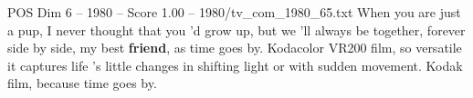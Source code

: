 \begin{textsample}{POS Dim 6 – 1980 – Score 1.00 – 1980/tv\_com\_1980\_65.txt}  \label{ex:f6_pos_054}
When you are just a pup, I never thought that you 'd grow up, but we 'll always be together, forever side by side, my best \textbf{friend}, as time goes by.
Kodacolor VR200 film, so versatile it captures life 's little changes in shifting light or with sudden movement.
Kodak film, because time goes by.

\end{textsample}
